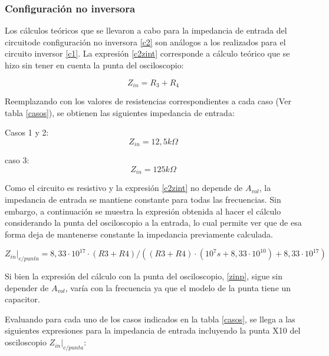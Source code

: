 \subsubsection*{Configuraci\'on no inversora}

Los c\'alculos te\'oricos que se llevaron a cabo para la impedancia de entrada del circuitode configuraci\'on no inversora \ref{c2} son an\'alogos a los realizados para el circuito inversor \ref{c1}. La expresi\'on \ref{c2zint} corresponde a c\'alculo te\'orico que se hizo sin tener en cuenta la punta del osciloscopio:

\begin{equation}
	Z_{in} =  R_3 + R_4
	\label{c2zint}
\end{equation}

Reemplazando con los valores de resistencias correspondientes a cada caso (Ver tabla \ref{casos}), se obtienen las siguientes impedancia de entrada:

Casos 1 y 2:
\begin{equation}
	Z_{in} =  12,5k\Omega
	\label{c2c1zint}
\end{equation}

caso 3:
\begin{equation}
	Z_{in} =  125k\Omega
	\label{c3c3zint}
\end{equation}

Como el circuito es resistivo y la expresi\'on \ref{c2zint} no depende de $A_{vol}$, la impedancia de entrada se mantiene constante para todas las frecuencias. Sin embargo, a continuaci\'on se muestra la expresi\'on obtenida al hacer el c\'alculo considerando la punta del osciloscopio a la entrada, lo cual permite ver que de esa forma deja de mantenerse constante la impedancia previamente calculada.


\begin{equation}
	Z_{in}\rvert_{c/punta} = 8,33 \cdot 10^{17} \cdot (R3 + R4)/((R3 + R4) \cdot (10^7 s + 8,33 \cdot 10^{10}) + 8,33 \cdot 10^{17})
	\label{zinp}
\end{equation}

Si bien la expresi\'on del c\'alculo con la punta del osciloscopio, \ref{zinp}, sigue sin depender de $A_{vol}$, var\'ia con la frecuencia ya que el modelo de la punta tiene un capacitor.

Evaluando para cada uno de los casos indicados en la tabla \ref{casos}, se llega a las siguientes expresiones para la impedancia de entrada incluyendo la punta X10 del osciloscopio $Z_{in}\rvert_{c/punta}$:

